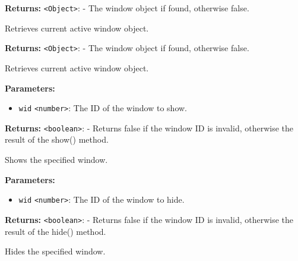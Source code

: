 \documentclass[12pt,a4paper]{article}
\begin{document}
\noindent \textbf{Returns:} \texttt{<Object>}: - The window object if found, otherwise false.

\noindent Retrieves current active window object.

\vspace{5mm}
\noindent {}


\noindent \textbf{Returns:} \texttt{<Object>}: - The window object if found, otherwise false.

\noindent Retrieves current active window object.

\vspace{5mm}
\noindent {}


\noindent \textbf{Parameters:}
\begin{itemize}
  \item \texttt{wid} \texttt{<number>}: The ID of the window to show.
\end{itemize}

\noindent \textbf{Returns:} \texttt{<boolean>}: - Returns false if the window ID is invalid, otherwise the result of the show() method.

\noindent Shows the specified window.

\vspace{5mm}
\noindent {}


\noindent \textbf{Parameters:}
\begin{itemize}
  \item \texttt{wid} \texttt{<number>}: The ID of the window to hide.
\end{itemize}

\noindent \textbf{Returns:} \texttt{<boolean>}: - Returns false if the window ID is invalid, otherwise the result of the hide() method.

\noindent Hides the specified window.

\vspace{5mm}
\noindent {}
\end{document}
